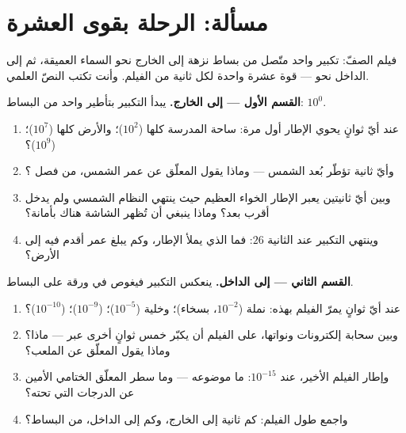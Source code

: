 \section{مسألة: الرحلة بقوى العشرة}

\begin{problem}\label{pb:g9:atoms-to-galaxies:1}
فيلم الصفّ: تكبير واحد متّصل من بساط نزهة إلى الخارج نحو
السماء العميقة، ثم إلى الداخل نحو  --- قوة عشرة واحدة
لكل ثانية من الفيلم. وأنت تكتب النصّ العلمي.

\medskip\noindent\textbf{القسم الأول --- إلى الخارج.}
يبدأ التكبير بتأطير  واحد من البساط: $10^{0}$.
\begin{enumerate}
  \item عند أيّ ثوانٍ يحوي الإطار أول مرة: ساحة المدرسة
        كلها ($10^{2}$)؛ والأرض كلها ($10^{7}$)؛ 
         ($10^{9}$)؟
  \item وأيّ ثانية تؤطّر بُعد الشمس --- وماذا يقول المعلّق عن
        عمر  الشمس، من فصل ؟
  \item وبين أيّ ثانيتين يعبر الإطار الخواء العظيم حيث ينتهي
        النظام الشمسي ولم يدخل أقرب  بعد؟ وماذا ينبغي أن
        تُظهر الشاشة هناك بأمانة؟
  \item وينتهي التكبير عند الثانية $26$: فما الذي يملأ
        الإطار، وكم يبلغ عمر أقدم  فيه  إلى
        الأرض؟
\end{enumerate}

\medskip\noindent\textbf{القسم الثاني --- إلى الداخل.}
ينعكس التكبير فيغوص في ورقة على البساط.
\begin{enumerate}[resume]
  \item عند أيّ ثوانٍ يمرّ الفيلم بهذه: نملة ($10^{-2}$،
        بسخاء)؛ وخلية ($10^{-5}$)؛  ($10^{-9}$)؛
         ($10^{-10}$)؟
  \item وبين سحابة إلكترونات  ونواتها، على الفيلم أن
        يكبّر خمس ثوانٍ أخرى عبر --- ماذا؟ وماذا يقول
        المعلّق عن الملعب؟
  \item وإطار الفيلم الأخير، عند $10^{-15}$: ما موضوعه ---
        وما سطر المعلّق الختامي الأمين عن الدرجات التي
        تحته؟
  \item واجمع طول الفيلم: كم ثانية إلى الخارج، وكم إلى
        الداخل، من  البساط؟
\end{enumerate}


\end{problem}
